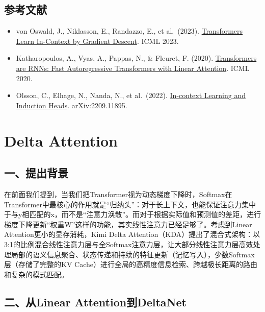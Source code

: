 \hypertarget{ux53c2ux8003ux6587ux732e-136}{%
\subsection{参考文献}\label{ux53c2ux8003ux6587ux732e-136}}

\begin{itemize}
\tightlist
\item
  von Oswald, J., Niklasson, E., Randazzo, E., et al.~(2023). \href{https://arxiv.org/abs/2212.07677}{Transformers Learn In-Context by Gradient Descent}. ICML 2023.
\item
  Katharopoulos, A., Vyas, A., Pappas, N., \& Fleuret, F. (2020). \href{https://arxiv.org/abs/2006.16236}{Transformers are RNNs: Fast Autoregressive Transformers with Linear Attention}. ICML 2020.
\item
  Olsson, C., Elhage, N., Nanda, N., et al.~(2022). \href{https://arxiv.org/abs/2209.11895}{In-context Learning and Induction Heads}. arXiv:2209.11895.
\end{itemize}

\clearpage

\hypertarget{delta-attention}{%
\section{Delta Attention}\label{delta-attention}}

\hypertarget{ux4e00ux63d0ux51faux80ccux666f-4}{%
\subsection{一、提出背景}\label{ux4e00ux63d0ux51faux80ccux666f-4}}

在前面我们提到，当我们把Transformer视为动态梯度下降时，Softmax在Transformer中最核心的作用就是``归纳头''：对于长上下文，也能保证注意力集中于与y相匹配的x，而不是``注意力涣散''。而对于根据实际值和预测值的差距，进行梯度下降更新``权重W''这样的功能，其实线性注意力已经足够了。考虑到Linear Attention更小的显存消耗，Kimi Delta Attention（KDA）提出了混合式架构：以3:1的比例混合线性注意力层与全Softmax注意力层，让大部分线性注意力层高效处理局部的语义信息聚合、状态传递和持续的特征更新（记忆写入），少数Softmax层（存储了完整的KV Cache）进行全局的高精度信息检索、跨越极长距离的路由和复杂的模式匹配。

\hypertarget{ux4e8cux4ecelinear-attentionux5230deltanet}{%
\subsection{二、从Linear Attention到DeltaNet}\label{ux4e8cux4ecelinear-attentionux5230deltanet}}

